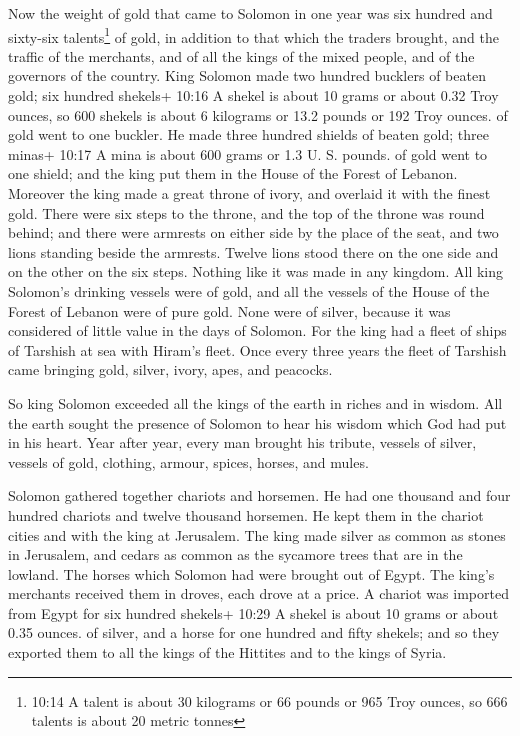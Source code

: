  Now the weight of gold that came to Solomon in one year
was six hundred and sixty-six talents\footnote{10:14 A talent is about
  30 kilograms or 66 pounds or 965 Troy ounces, so 666 talents is about
  20 metric tonnes} of gold,  in addition to that which the
traders brought, and the traffic of the merchants, and of all the kings
of the mixed people, and of the governors of the country. 
King Solomon made two hundred bucklers of beaten gold; six hundred
shekels+ 10:16 A shekel is about 10 grams or about 0.32 Troy ounces, so
600 shekels is about 6 kilograms or 13.2 pounds or 192 Troy ounces. of
gold went to one buckler.  He made three hundred shields of
beaten gold; three minas+ 10:17 A mina is about 600 grams or 1.3 U. S.
pounds. of gold went to one shield; and the king put them in the House
of the Forest of Lebanon.  Moreover the king made a great
throne of ivory, and overlaid it with the finest gold. 
There were six steps to the throne, and the top of the throne was round
behind; and there were armrests on either side by the place of the seat,
and two lions standing beside the armrests.  Twelve lions
stood there on the one side and on the other on the six steps. Nothing
like it was made in any kingdom.  All king Solomon's
drinking vessels were of gold, and all the vessels of the House of the
Forest of Lebanon were of pure gold. None were of silver, because it was
considered of little value in the days of Solomon.  For the
king had a fleet of ships of Tarshish at sea with Hiram's fleet. Once
every three years the fleet of Tarshish came bringing gold, silver,
ivory, apes, and peacocks.

 So king Solomon exceeded all the kings of the earth in
riches and in wisdom.  All the earth sought the presence of
Solomon to hear his wisdom which God had put in his heart. 
Year after year, every man brought his tribute, vessels of silver,
vessels of gold, clothing, armour, spices, horses, and mules.

 Solomon gathered together chariots and horsemen. He had
one thousand and four hundred chariots and twelve thousand horsemen. He
kept them in the chariot cities and with the king at Jerusalem.
 The king made silver as common as stones in Jerusalem, and
cedars as common as the sycamore trees that are in the lowland.
 The horses which Solomon had were brought out of Egypt.
The king's merchants received them in droves, each drove at a price.
 A chariot was imported from Egypt for six hundred shekels+
10:29 A shekel is about 10 grams or about 0.35 ounces. of silver, and a
horse for one hundred and fifty shekels; and so they exported them to
all the kings of the Hittites and to the kings of Syria.

